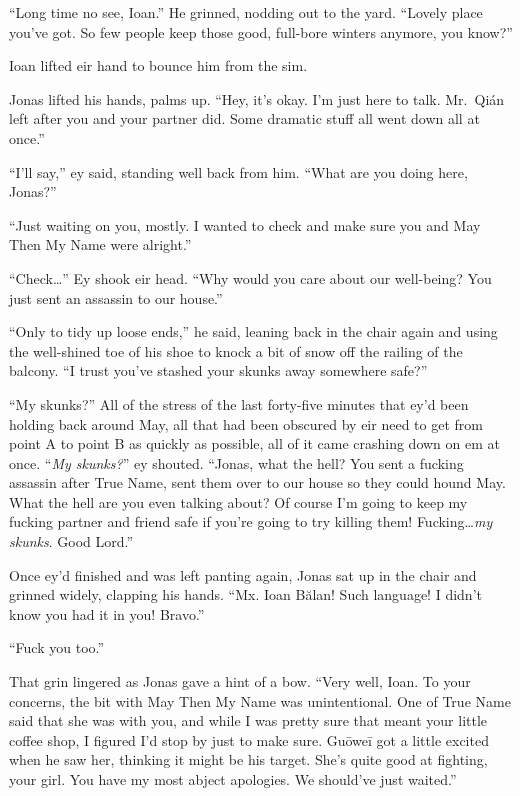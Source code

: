 ``Long time no see, Ioan.'' He grinned, nodding out to the yard. ``Lovely place you've got. So few people keep those good, full-bore winters anymore, you know?''

Ioan lifted eir hand to bounce him from the sim.

Jonas lifted his hands, palms up. ``Hey, it's okay. I'm just here to talk. Mr.~Qián left after you and your partner did. Some dramatic stuff all went down all at once.''

``I'll say,'' ey said, standing well back from him. ``What are you doing here, Jonas?''

``Just waiting on you, mostly. I wanted to check and make sure you and May Then My Name were alright.''

``Check\ldots{}'' Ey shook eir head. ``Why would you care about our well-being? You just sent an assassin to our house.''

``Only to tidy up loose ends,'' he said, leaning back in the chair again and using the well-shined toe of his shoe to knock a bit of snow off the railing of the balcony. ``I trust you've stashed your skunks away somewhere safe?''

``My skunks?'' All of the stress of the last forty-five minutes that ey'd been holding back around May, all that had been obscured by eir need to get from point A to point B as quickly as possible, all of it came crashing down on em at once. ``\emph{My skunks?}'' ey shouted. ``Jonas, what the hell? You sent a fucking assassin after True Name, sent them over to our house so they could hound May. What the hell are you even talking about? Of course I'm going to keep my fucking partner and friend safe if you're going to try killing them! Fucking\ldots{}\emph{my skunks}. Good Lord.''

Once ey'd finished and was left panting again, Jonas sat up in the chair and grinned widely, clapping his hands. ``Mx. Ioan Bălan! Such language! I didn't know you had it in you! Bravo.''

``Fuck you too.''

That grin lingered as Jonas gave a hint of a bow. ``Very well, Ioan. To your concerns, the bit with May Then My Name was unintentional. One of True Name said that she was with you, and while I was pretty sure that meant your little coffee shop, I figured I'd stop by just to make sure. Guōweī got a little excited when he saw her, thinking it might be his target. She's quite good at fighting, your girl. You have my most abject apologies. We should've just waited.''

